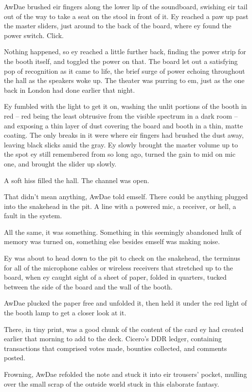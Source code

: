 AwDae brushed eir fingers along the lower lip of the soundboard, swishing eir tail out of the way to take a seat on the stool in front of it. Ey reached a paw up past the master sliders, just around to the back of the board, where ey found the power switch. Click.

Nothing happened, so ey reached a little further back, finding the power strip for the booth itself, and toggled the power on that. The board let out a satisfying pop of recognition as it came to life, the brief surge of power echoing throughout the hall as the speakers woke up. The theater was purring to em, just as the one back in London had done earlier that night.

Ey fumbled with the light to get it on, washing the unlit portions of the booth in red -- red being the least obtrusive from the visible spectrum in a dark room -- and exposing a thin layer of dust covering the board and booth in a thin, matte coating. The only breaks in it were where eir fingers had brushed the dust away, leaving black slicks amid the gray. Ey slowly brought the master volume up to the spot ey still remembered from so long ago, turned the gain to mid on mic one, and brought the slider up slowly.

A soft hiss filled the hall. The channel was open.

That didn't mean anything, AwDae told emself. There could be anything plugged into the snakehead in the pit. A line with a powered mic, a receiver, or hell, a fault in the system.

All the same, it was something. Something in this seemingly abandoned hulk of memory was turned on, something else besides emself was making noise.

Ey was about to head down to the pit to check on the snakehead, the terminus for all of the microphone cables or wireless receivers that stretched up to the board, when ey caught sight of a sheet of paper, folded in quarters, tucked between the side of the board and the wall of the booth.

AwDae plucked the paper free and unfolded it, then held it under the red light of the booth lamp to get a closer look at it.

There, in tiny print, was a good chunk of the content of the card ey had created earlier that morning to add to the deck. Cicero's DDR ledger, containing transactions that comprised votes made, bounties collected, and comments posted.

Frowning, AwDae refolded the note and stuck it into eir trousers' pocket, mulling over the small scrap of the outside world stuck in this elaborate fantasy.

